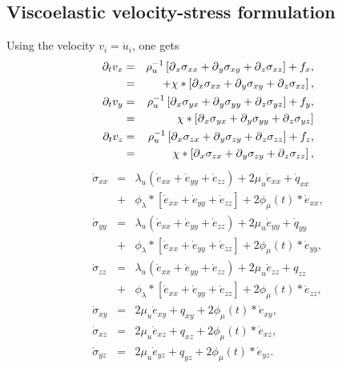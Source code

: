 \documentclass[11pt]{article}
\begin{document}
\subsection*{Viscoelastic velocity-stress formulation} 
Using the velocity $v_i = \dot{u}_i$, one gets
\begin{eqnarray*}
  \partial_t{v}_x & = & \rho^{-1}_u\left[\mbox{$\partial$}_x \sigma_{xx} +\mbox{$\partial$}_y \sigma_{xy} 
                                    +\mbox{$\partial$}_z \sigma_{xz}\right] + f_x, \\
            & = & + \chi*\left[\mbox{$\partial$}_x \sigma_{xx} +\mbox{$\partial$}_y \sigma_{xy} 
                                    +\mbox{$\partial$}_z \sigma_{xz}\right], \\
  \partial_t{v}_y & = & \rho^{-1}_u\left[\mbox{$\partial$}_x \sigma_{yx} +\mbox{$\partial$}_y \sigma_{yy} 
                                    +\mbox{$\partial$}_z \sigma_{yz}\right] + f_y, \\
            & = & \chi*\left[\mbox{$\partial$}_x \sigma_{yx} +\mbox{$\partial$}_y \sigma_{yy} 
                                    +\mbox{$\partial$}_z \sigma_{yz}\right] \\
  \partial_t{v}_z & = & \rho^{-1}_u\left[\mbox{$\partial$}_x \sigma_{zx} +\mbox{$\partial$}_y \sigma_{zy} 
                                    +\mbox{$\partial$}_z \sigma_{zz}\right] + f_z, \\
            & = & \chi*\left[\mbox{$\partial$}_x \sigma_{zx} +\mbox{$\partial$}_y \sigma_{zy} 
                                    +\mbox{$\partial$}_z \sigma_{zz}\right],
\end{eqnarray*}
\begin{eqnarray*}
  \dot{\sigma}_{xx} & = & \lambda_u \left (\dot{e}_{xx} 
                                 + \dot{e}_{yy} + \dot{e}_{zz}\right)
                                 + 2\mu_u \dot{e}_{xx} +\dot{q}_{xx}   \\ 
              & + & \phi_{\lambda}*[\dot{e}_{xx}+\dot{e}_{yy}+\dot{e}_{zz}] + 2\phi_{\mu}(t)*\dot{e}_{xx}, \\
  \dot{\sigma}_{yy} & = & \lambda_u \left (\dot{e}_{xx} + \dot{e}_{yy} + \dot{e}_{zz}\right)
                                                     + 2\mu_u \dot{e}_{yy} +\dot{q}_{yy} \nonumber\\
              & + & \phi_{\lambda}*[\dot{e}_{xx}+\dot{e}_{yy}+\dot{e}_{zz}] + 2\phi_{\mu}(t)*\dot{e}_{yy},\\
  \dot{\sigma}_{zz} & = & \lambda_u \left (\dot{e}_{xx} + \dot{e}_{yy} + \dot{e}_{zz}\right)
                                                     + 2\mu_u \dot{e}_{zz} +q_{zz} \nonumber\\
              & + & \phi_{\lambda}*[\dot{e}_{xx}+\dot{e}_{yy}+\dot{e}_{zz}] + 2\phi_{\mu}(t)*\dot{e}_{zz},\\
  \dot{\sigma}_{xy} & = & 2\mu_u \dot{e}_{xy} +q_{xy} + 2\phi_{\mu}(t)*\dot{e}_{xy},\\
  \dot{\sigma}_{xz} & = & 2\mu_u \dot{e}_{xz} +q_{xz} + 2\phi_{\mu}(t)*\dot{e}_{xz},\\
  \dot{\sigma}_{yz} & = & 2\mu_u \dot{e}_{yz} +q_{yz}+  2\phi_{\mu}(t)*\dot{e}_{yz}.
\end{eqnarray*}
\end{document}
